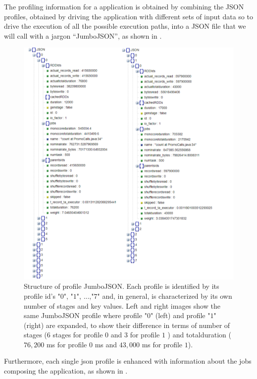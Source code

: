The profiling information for a \tool application is obtained by combining the JSON profiles, obtained by driving the application with different sets of input data so to drive the execution of all the possible execution paths, into a JSON file that we will call with a jargon “JumboJSON”, as shown in .
\begin{figure}[tbhp]
	\hspace*{-2cm}
	\centering
	\includegraphics[width=18cm]{images/xsparksymb_profile_structure}
	\caption{Structure of profile JumboJSON. Each profile is identified by its profile id's {"$0$", "$1$", ...,"$7$"} and, in general, is characterized by its own number of stages and key values. Left and right images show the same JumboJSON profile where profile "$0$" (left) and profile "$1$" (right) are expanded, to show their difference in terms of number of stages ($6$ stages for profile $0$ and $3$ for profile $1$ ) and totalduration ($76,200$ ms for profile $0$ ms and  $43,000$ ms for profile $1$).}
	\label{fig:jumboJSON_structure}
\end{figure}
Furthermore, each single json profile is enhanced with information about the jobs composing the application, as shown in .

